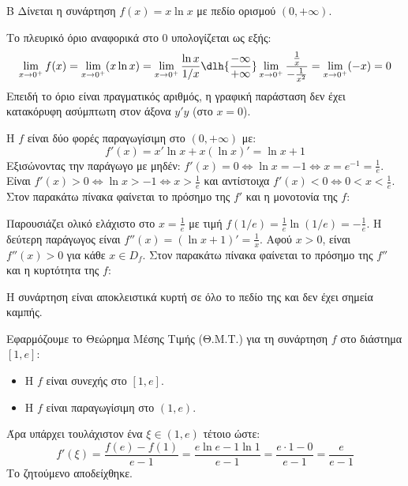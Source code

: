 \begin{thema}{Β}
Δίνεται η συνάρτηση $f(x) = x \ln x$ με πεδίο ορισμού $(0, +\infty)$.
\begin{erwthma}
\item Το πλευρικό όριο αναφορικά στο 0 υπολογίζεται ως εξής:
\[ \lim_{x\to0^+} f(x) = \lim_{x\to0^+} (x \ln x) = \lim_{x\to0^+} \frac{\ln x}{1/x} \dlh{\frac{-\infty}{+\infty}} \lim_{x\to0^+} \frac{\frac{1}{x}}{-\frac{1}{x^2}} = \lim_{x\to0^+} (-x) = 0 \]
Επειδή το όριο είναι πραγματικός αριθμός, η γραφική παράσταση δεν έχει κατακόρυφη ασύμπτωτη στον άξονα $y'y$ (στο $x=0$).

\item Η $f$ είναι δύο φορές παραγωγίσιμη στο $(0, +\infty)$ με:
\[ f'(x) = x' \ln x + x (\ln x)' = \ln x + 1 \]
Εξισώνοντας την παράγωγο με μηδέν: $f'(x) = 0 \Leftrightarrow \ln x = -1 \Leftrightarrow x = e^{-1} = \frac{1}{e}$.
Είναι $f'(x) > 0 \Leftrightarrow \ln x > -1 \Leftrightarrow x > \frac{1}{e}$ και αντίστοιχα $f'(x) < 0 \Leftrightarrow 0 < x < \frac{1}{e}$.
Στον παρακάτω πίνακα φαίνεται το πρόσημο της $f'$ και η μονοτονία της $f$:
\begin{center}
\end{center}
Παρουσιάζει ολικό ελάχιστο στο $x = \frac{1}{e}$ με τιμή $f(1/e) = \frac{1}{e} \ln(1/e) = -\frac{1}{e}$.
Η δεύτερη παράγωγος είναι $f''(x) = (\ln x + 1)' = \frac{1}{x}$.
Αφού $x > 0$, είναι $f''(x) > 0$ για κάθε $x \in D_f$.
Στον παρακάτω πίνακα φαίνεται το πρόσημο της $f''$ και η κυρτότητα της $f$:
\begin{center}
\end{center}
Η συνάρτηση είναι αποκλειστικά κυρτή σε όλο το πεδίο της και δεν έχει σημεία καμπής.

\item Εφαρμόζουμε το Θεώρημα Μέσης Τιμής (Θ.Μ.Τ.) για τη συνάρτηση $f$ στο διάστημα $[1, e]$:
\begin{itemize}
\item Η $f$ είναι συνεχής στο $[1, e]$.
\item Η $f$ είναι παραγωγίσιμη στο $(1, e)$.
\end{itemize}
Άρα υπάρχει τουλάχιστον ένα $\xi \in (1, e)$ τέτοιο ώστε:
\[ f'(\xi) = \frac{f(e) - f(1)}{e - 1} = \frac{e\ln e - 1\ln 1}{e - 1} = \frac{e\cdot 1 - 0}{e-1} = \frac{e}{e-1} \]
Το ζητούμενο αποδείχθηκε.


\end{erwthma}
\end{thema}
